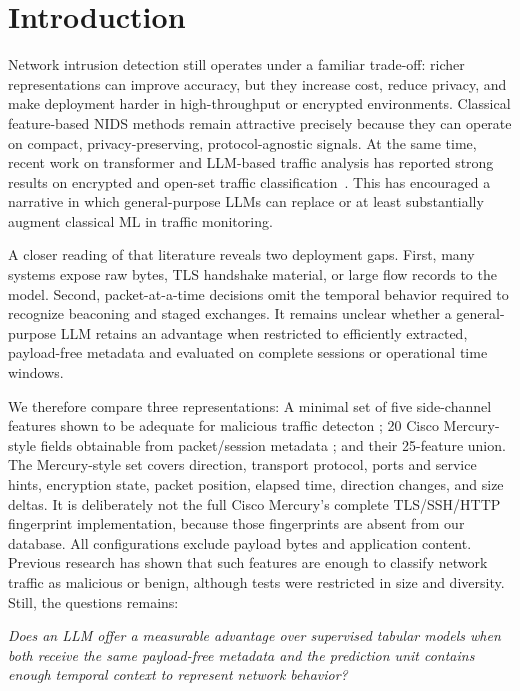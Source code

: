\documentclass[letterpaper,twocolumn,10pt]{article}
\begin{document}
\section{Introduction}\label{sec:intro}

Network intrusion detection still operates under a familiar trade-off: richer representations can improve accuracy, but they increase cost, reduce privacy, and make deployment harder in high-throughput or encrypted environments. Classical feature-based NIDS methods remain attractive precisely because they can operate on compact, privacy-preserving, protocol-agnostic signals. At the same time, recent work on transformer and LLM-based traffic analysis has reported strong results on encrypted and open-set traffic classification~\cite{lin2022etbert,cui2025trafficllm,jia2025mentor,ginige2024trafficgpt,zhang2025llmntd}. This has encouraged a narrative in which general-purpose LLMs can replace or at least substantially augment classical ML in traffic monitoring.

A closer reading of that literature reveals two deployment gaps. First, many systems expose raw bytes, TLS handshake material, or large flow records to the model. Second, packet-at-a-time decisions omit the temporal behavior required to recognize beaconing and staged exchanges. It remains unclear whether a general-purpose LLM retains an advantage when restricted to efficiently extracted, payload-free metadata and evaluated on complete sessions or operational time windows.

We therefore compare three representations: A minimal set of five side-channel features shown to be adequate for malicious traffic detecton \cite{stergiopoulos2018side}; 20 Cisco Mercury-style fields obtainable from packet/session metadata \cite{ciscoMercury}; and their 25-feature union. The Mercury-style set covers direction, transport protocol, ports and service hints, encryption state, packet position, elapsed time, direction changes, and size deltas. It is deliberately not the full Cisco Mercury's complete TLS/SSH/HTTP fingerprint implementation, because those fingerprints are absent from our database. All configurations exclude payload bytes and application content. Previous research \cite{stergiopoulos2018side,sharafaldin2018toward, ciscoMercury} has shown that such features are enough to classify network traffic as malicious or benign, although tests were restricted in size and diversity. Still, the questions remains: 

\textit{Does an LLM offer a measurable advantage over supervised tabular models when both receive the same payload-free metadata and the prediction unit contains enough temporal context to represent network behavior?}
\end{document}
